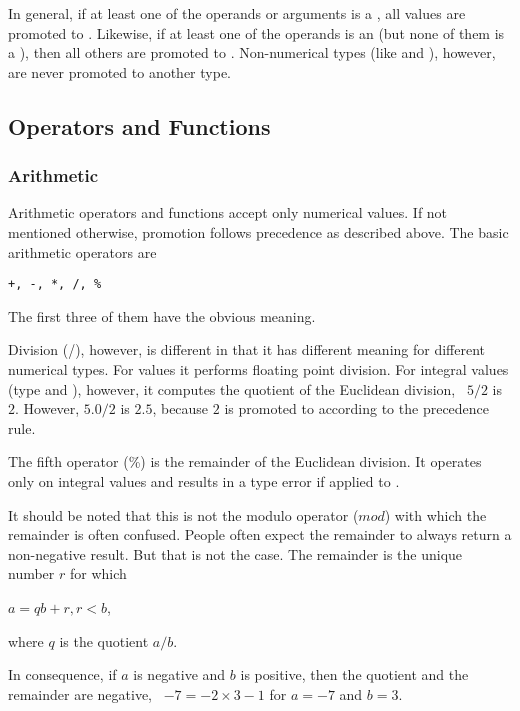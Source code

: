 In general, if at least one of the
operands or arguments is a ,
all values are promoted to .
Likewise, if at least one of the operands
is an  (but none of them is a ),
then all others are promoted to .
Non-numerical types (like  and ),
however, are never promoted to another type.

\subsection{Operators and Functions}
\subsubsection{Arithmetic}
Arithmetic operators and functions
accept only numerical values.
If not mentioned otherwise,
promotion follows precedence as described above.
The basic arithmetic operators are
\begin{verbatim}
+, -, *, /, %
\end{verbatim}
The first three of them have the obvious meaning.

Division (/), however, is different in that it
has different meaning for different numerical types.
For  values it performs floating point
division. For integral values (type  and
), however, it computes the quotient
of the Euclidean division, \eg\ $5/2$ is $2$.
However, $5.0/2$ is $2.5$, because $2$ is promoted
to  according to the precedence rule.

The fifth operator (\%) is the remainder of
the Euclidean division.
It operates only on integral values and results
in a type error if applied to .

It should be noted that this is not the modulo
operator ($mod$) with which the remainder is
often confused. People often expect the 
remainder to always return a non-negative result.
But that is not the case. The remainder is the
unique number $r$ for which

$a = qb + r, r < b$,

where $q$ is the quotient $a/b$.

In consequence, if $a$ is negative and $b$
is positive, then the quotient and the 
remainder are negative, \eg\
$-7 = -2\times 3 -1$ for $a=-7$ and $b=3$.

